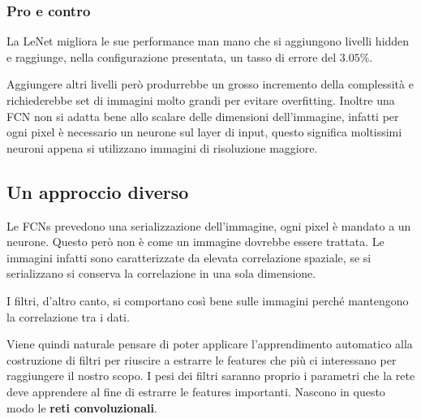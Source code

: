 \subsubsection{Pro e contro}
La LeNet migliora le sue performance man mano che si aggiungono livelli hidden e raggiunge, nella configurazione presentata, un tasso di errore del $3.05\%$. 

Aggiungere altri livelli però produrrebbe un grosso incremento della complessità e richiederebbe set di immagini molto grandi per evitare overfitting. Inoltre una FCN non si adatta bene allo scalare delle dimensioni dell'immagine, infatti per ogni pixel è necessario un neurone sul layer di input, questo significa moltissimi neuroni appena si utilizzano immagini di risoluzione maggiore.

\subsection{Un approccio diverso}
Le FCNs prevedono una serializzazione dell'immagine, ogni pixel è mandato a un neurone. Questo però non è come un immagine dovrebbe essere trattata. Le immagini infatti sono caratterizzate da elevata correlazione spaziale, se si serializzano si conserva la correlazione in una sola dimensione.

I filtri, d'altro canto, si comportano così bene sulle immagini perché mantengono la correlazione tra i dati.

Viene quindi naturale pensare di poter applicare l'apprendimento automatico alla costruzione di filtri per riuscire a estrarre le features che più ci interessano per raggiungere il nostro scopo. I pesi dei filtri saranno proprio i parametri che la rete deve apprendere al fine di estrarre le features importanti. Nascono in questo modo le \textbf{reti convoluzionali}.